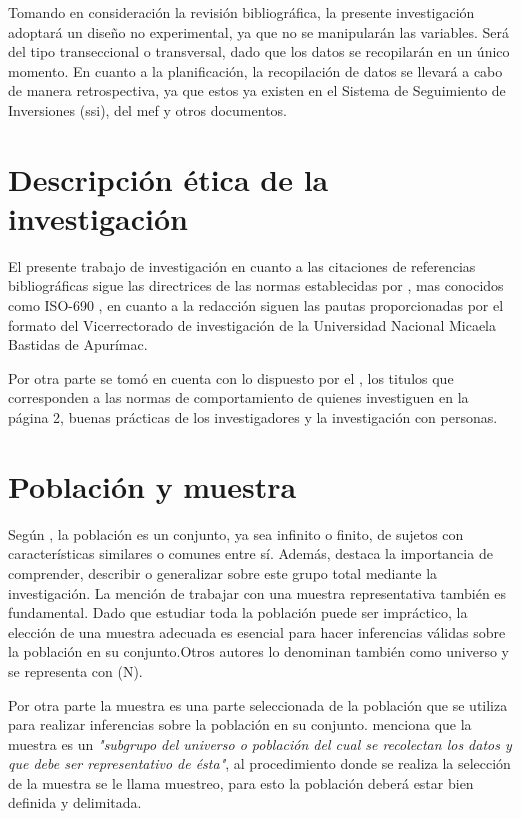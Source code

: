 Tomando en consideración la revisión bibliográfica, la presente investigación adoptará un diseño no experimental, ya que no se manipularán las variables. Será del tipo transeccional o transversal, dado que los datos se recopilarán en un único momento. En cuanto a la planificación, la recopilación de datos se llevará a cabo de manera retrospectiva, ya que estos ya existen en el Sistema de Seguimiento  de  Inversiones (\acrshort{ssi}), del \acrshort{mef} y otros documentos.

\section{Descripción ética de la investigación}

El presente trabajo de investigación en cuanto a las citaciones de referencias bibliográficas sigue las directrices de las normas establecidas por \cite[]{IOS2021}, mas conocidos como ISO-690 , en cuanto a la redacción siguen las pautas proporcionadas por el formato del Vicerrectorado de investigación de la Universidad Nacional Micaela Bastidas de Apurímac.

Por otra parte se tomó en cuenta con lo dispuesto por el \cite[]{VRI2018}, los titulos que corresponden a las normas de comportamiento de quienes investiguen en la página 2, buenas prácticas de los investigadores y la investigación con personas.

\section{Población y muestra}

Según \cite[89]{AriasGonzales2020}, la población es un conjunto, ya sea infinito o finito, de sujetos con características similares o comunes entre sí. Además, destaca la importancia de comprender, describir o generalizar sobre este grupo total mediante la investigación. La mención de trabajar con una muestra representativa también es fundamental. Dado que estudiar toda la población puede ser impráctico, la elección de una muestra adecuada es esencial para hacer inferencias válidas sobre la población en su conjunto.Otros autores lo denominan también como  universo y se representa con (N).

Por otra parte la muestra es una parte seleccionada de la población que se utiliza para realizar inferencias sobre la población en su conjunto. \cite[173]{HernandezSampieri2014} menciona que la muestra es un \emph{"subgrupo del universo o población del cual se recolectan los datos y que debe ser representativo de ésta"}, al procedimiento donde se realiza la selección de la muestra se le llama muestreo, para esto la población deberá estar bien definida y delimitada.

